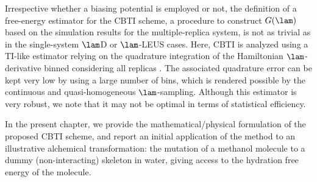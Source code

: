 Irrespective whether a biasing potential is employed or not, the definition of a free-energy estimator for the CBTI scheme, \ie{} a procedure to construct $G(\lam)$ based on the simulation results for the multiple-replica system, is not as trivial\cite{KR17.1} as in the single-system $\lam$D or $\lam$-LEUS cases. Here, CBTI is analyzed using a TI-like estimator\cite{KA05.1} relying on the quadrature integration of the  Hamiltonian $\lam$-derivative binned  considering all replicas . The associated quadrature error can be kept very low by using a large number of bins, which is rendered possible by the continuous and quasi-homogeneous $\lam$-sampling. 
%
Although this estimator is very robust, we note that it may not be optimal in terms of statistical efficiency\cite{LU04.3,SH05.6,SH08.7,FA09.4,TA12.1,DE16.9,DI17.5,ZH17.6}. 


In the present chapter, we provide the mathematical/physical formulation of the proposed CBTI scheme, and report an initial application of the method to an illustrative alchemical transformation: the mutation of a methanol molecule to a dummy (non-interacting) skeleton in water, giving access to the hydration free energy of the molecule.
